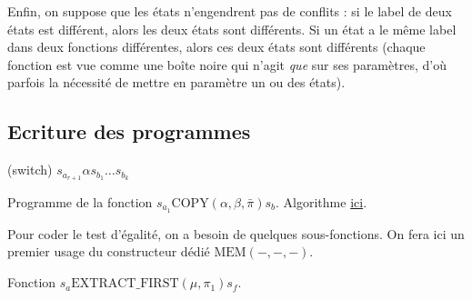 \documentclass{report}
\begin{document}
\begin{appendices}
					
					Enfin, on suppose que les états n'engendrent pas de conflits : si le label de deux états est différent, alors les deux états sont différents. Si un état a le même label dans deux fonctions différentes, alors ces deux états sont différents (chaque fonction est vue comme une boîte noire qui n'agit \emph{que} sur ses paramètres, d'où parfois la nécessité de mettre en paramètre un ou des états).
				
				
				\subsection{Ecriture des programmes}
				\label{subsec:ecriture_programmes}
				
				
				\begin{algorithm}[H]
					\label{prog:A_RAM_fn_COPY}
					
					
					(switch) 	$s_{a_{r+1}} \alpha s_{b_1} \dots s_{b_k}$\;
					
					
					
					\caption{Programme de la fonction $s_{a_1}\text{COPY}(\alpha, \beta, \bar{\pi}) s_b$. Algorithme \hyperref[algo:A_RAM_fn_COPY]{ici}.}
				\end{algorithm}
				
				\espace
				
				Pour coder le test d'égalité, on a besoin de quelques sous-fonctions. On fera ici un premier usage du constructeur dédié $\text{MEM}\left( -, -, -\right)$.
				
				\espace
				
				\begin{algorithm}[H]
					\label{algo:A_RAM_fn_extract_first}
					
					
					\caption{Fonction $s_a \text{EXTRACT\_FIRST}(\mu, \pi_1) s_f$. }
				\end{algorithm}
				

\end{appendices}
\end{document}
